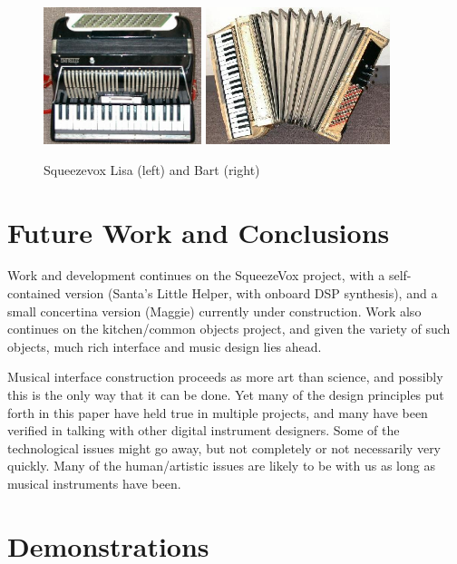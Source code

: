 \begin{figure}[t]
\centering
\includegraphics[height=40mm]{Figure11SQBart.jpg}      
\includegraphics[height=40mm]{Figure11SQLisa.jpg}
\caption{Squeezevox Lisa (left) and Bart (right)}
\label{Cook:cook-fig:8}       %
\end{figure}



\section{Future Work  and Conclusions}

Work and development continues on the SqueezeVox project, with a self-contained
version (Santa's Little Helper, with onboard DSP synthesis), and a small
concertina version (Maggie) currently under construction.  Work also continues on
the kitchen/common objects project, and given the variety of such objects, much
rich interface and music design lies ahead.

Musical interface construction proceeds as more art than science, and possibly
this is the only way that it can be done.  Yet many of the design principles put
forth in this paper have held true in multiple projects, and many have been
verified in talking with other digital instrument designers.  Some of the
technological issues might go away, but not completely or not necessarily very
quickly.  Many of the human/artistic issues are likely to be with us as long as
musical instruments have been.

\section{Demonstrations}

